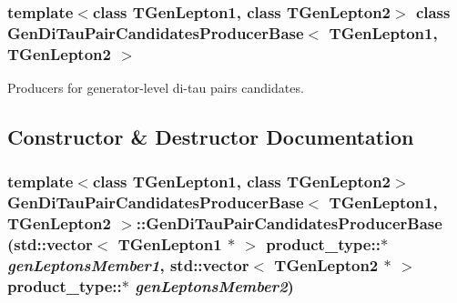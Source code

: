 \subsubsection*{template$<$class TGenLepton1, class TGenLepton2$>$ class GenDiTauPairCandidatesProducerBase$<$ TGenLepton1, TGenLepton2 $>$}

Producers for generator-\/level di-\/tau pairs candidates. 

\subsection{Constructor \& Destructor Documentation}
\hypertarget{classGenDiTauPairCandidatesProducerBase_a882c0c0785016dc0ed619bdeec09ca71}{
\subsubsection[{GenDiTauPairCandidatesProducerBase}]{\setlength{\rightskip}{0pt plus 5cm}template$<$class TGenLepton1, class TGenLepton2$>$ {\bf GenDiTauPairCandidatesProducerBase}$<$ TGenLepton1, TGenLepton2 $>$::{\bf GenDiTauPairCandidatesProducerBase} (std::vector$<$ TGenLepton1 $\ast$ $>$ product\_\-type::$\ast$ {\em genLeptonsMember1}, \/  std::vector$<$ TGenLepton2 $\ast$ $>$ product\_\-type::$\ast$ {\em genLeptonsMember2})}}
\label{classGenDiTauPairCandidatesProducerBase_a882c0c0785016dc0ed619bdeec09ca71}


